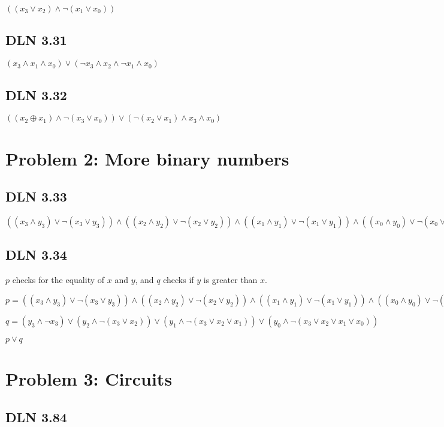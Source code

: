 \documentclass[titlepage]{article}
\begin{document}
\(((x_3\lor x_2)\land \lnot(x_1\lor x_0))\)

\subsection{DLN 3.31} 

\((x_3 \land x_1 \land x_0) \lor (\lnot x_3 \land x_2 \land \lnot x_1 \land x_0)\)

\subsection{DLN 3.32} 

\(((x_2 \oplus x_1) \land \lnot(x_3 \lor x_0)) \lor  (\lnot(x_2 \lor x_1) \land x_3 \land x_0)\)


\section{Problem 2: More binary numbers}

\subsection{DLN 3.33} 

\( ((x_3 \land y_3) \lor \lnot(x_3 \lor y_3)) \land ((x_2 \land y_2) \lor \lnot(x_2 \lor y_2)) \land ((x_1 \land y_1) \lor \lnot(x_1\lor y_1)) \land ((x_0 \land y_0) \lor \lnot(x_0 \lor y_0))    \)

\subsection{DLN 3.34} 

$p$ checks for the equality of $x$ and $y$, and $q$ checks if $y$ is greater than $x$.

\( p = ((x_3 \land y_3) \lor \lnot(x_3 \lor y_3)) \land ((x_2 \land y_2) \lor \lnot(x_2 \lor y_2)) \land ((x_1 \land y_1) \lor \lnot(x_1\lor y_1)) \land ((x_0 \land y_0) \lor \lnot(x_0 \lor y_0))    \)

\( q = (y_3 \land \lnot x_3) \lor (y_2 \land \lnot(x_3 \lor x_2)) \lor (y_1 \land \lnot(x_3 \lor x_2 \lor x_1)) \lor (y_0 \land \lnot(x_3 \lor x_2 \lor x_1 \lor x_0))    \)

\( p \lor q \)

\section{Problem 3: Circuits}

\subsection{DLN 3.84} 
\end{document}
